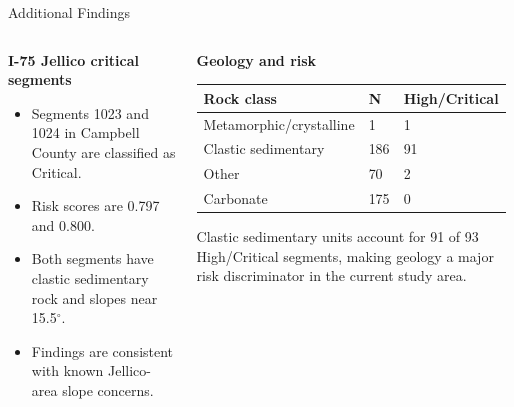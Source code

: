 \documentclass[aspectratio=169,11pt]{beamer}
\newcommand{\slideheading}[1]{\vspace{0.05cm}\textbf{#1}\vspace{0.12cm}}
\begin{document}
\begin{frame}{Additional Findings}
\begin{columns}[T,onlytextwidth]
\begin{column}{0.48\textwidth}
\slideheading{I-75 Jellico critical segments}
\begin{itemize}\setlength\itemsep{0.3em}\small
  \item Segments 1023 and 1024 in Campbell County are classified as Critical.
  \item Risk scores are 0.797 and 0.800.
  \item Both segments have clastic sedimentary rock and slopes near 15.5$^\circ$.
  \item Findings are consistent with known Jellico-area slope concerns.
\end{itemize}
\end{column}
\begin{column}{0.48\textwidth}
\slideheading{Geology and risk}
\scriptsize
\begin{tabularx}{\linewidth}{Y C{1.0cm} C{1.8cm}}
\toprule
\textbf{Rock class} & \textbf{N} & \textbf{High/Critical} \\
\midrule
Metamorphic/crystalline & 1 & 1 \\
Clastic sedimentary & 186 & 91 \\
Other & 70 & 2 \\
Carbonate & 175 & 0 \\
\bottomrule
\end{tabularx}
\vspace{0.2cm}
{\footnotesize Clastic sedimentary units account for 91 of 93 High/Critical segments, making geology a major risk discriminator in the current study area.}
\end{column}
\end{columns}
\end{frame}
\end{document}
